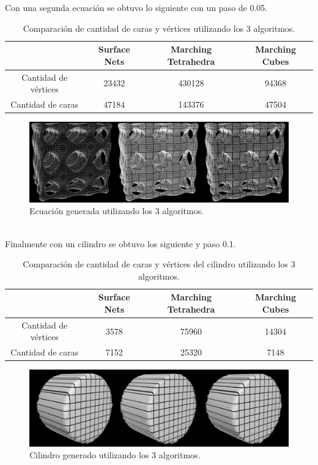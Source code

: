 \documentclass[12pt]{article}
\begin{document}
Con una segunda ecuación se obtuvo lo siguiente con un paso de 0.05.
\begin{table}[h!]
  \centering
  \label{tab:table1}
  \begin{tabular}{cccc}
    \toprule
    & Surface Nets & Marching Tetrahedra & Marching Cubes\\
    \midrule
    Cantidad de vértices & 23432 & 430128 & 94368\\
    Cantidad de caras & 47184 & 143376 & 47504\\
    \bottomrule
  \end{tabular}
  \caption{Comparación de cantidad de caras y vértices utilizando los 3 algoritmos.}
\end{table}
\begin{figure}[h!]
\includegraphics[width=\linewidth,center]{compec2.png}
\caption{Ecuación generada utilizando los 3 algoritmos.}
\end{figure}
\\Finalmente con un cilindro se obtuvo los siguiente y paso 0.1.
\begin{table}[h!]
  \centering
  \label{tab:table1}
  \begin{tabular}{cccc}
    \toprule
    & Surface Nets & Marching Tetrahedra & Marching Cubes\\
    \midrule
    Cantidad de vértices & 3578 & 75960 & 14304\\
    Cantidad de caras & 7152 & 25320 & 7148\\
    \bottomrule
  \end{tabular}
  \caption{Comparación de cantidad de caras y vértices del cilindro utilizando los 3 algoritmos.}
\end{table}
\begin{figure}[h!]
\includegraphics[width=\linewidth,center]{compec3.png}
\caption{Cilindro generado utilizando los 3 algoritmos.}
\end{figure}
\end{document}

